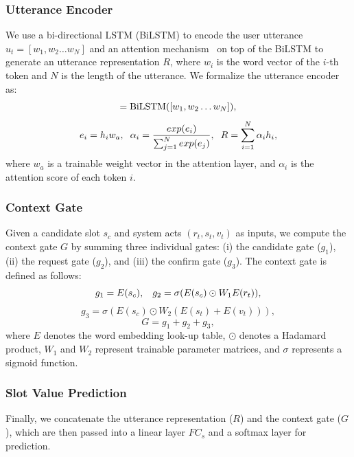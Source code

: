 \documentclass[letterpaper]{article}
\begin{document}
\subsubsection{Utterance Encoder}
We use a bi-directional LSTM (BiLSTM) to encode the user utterance $u_t=[w_1, w_2 \dots w_N]$ and an attention mechanism~\cite{felbo2017using} on top of the BiLSTM to generate an utterance representation $R$, where $w_i$ is the word vector of the $i$-th token and $N$ is the length of the utterance. We formalize the utterance encoder as:
\begin{equation}
    [h_1, h_2 \dots h_N] = \textnormal{BiLSTM}([w_1, w_2 \dots  w_N]),
\end{equation}
\begin{equation} \label{eq5}
    e_i = h_i w_a, \hspace{2mm}
    \alpha_i = \frac{exp(e_i)}{\sum_{j=1}^N exp(e_j)}, \hspace{2mm} R = \sum_{i=1}^N \alpha_i h_i,
\end{equation}
where $w_a$ is a trainable weight vector in the attention layer, and $\alpha_i$ is the attention score of each token $i$.

\subsubsection{Context Gate}
Given a candidate slot $s_c$ and system acts $(r_t, s_t, v_t)$ as inputs, we compute the context gate $G$ by summing three individual gates: (i) the candidate gate ($g_1$), (ii) the request gate ($g_2$), and (iii) the confirm gate ($g_3$). The context gate is defined as follows:
\begin{equation}
    g_1 = E(s_c), \hspace{3mm} g_2 = \sigma(E(s_c) \odot W_1 E(r_t)),
\end{equation}
\begin{equation}
    g_3 = \sigma(E(s_c) \odot W_2 (E(s_t)+E(v_t))),
\end{equation}
\begin{equation}
    G = g_1 + g_2 + g_3,
\end{equation}
where $E$ denotes the word embedding look-up table, $\odot$ denotes a Hadamard product, $W_1$ and $W_2$ represent trainable parameter matrices, and $\sigma$ represents a sigmoid function.

\subsubsection{Slot Value Prediction}
Finally, we concatenate the utterance representation ($R$) and the context gate ($G$), which are then passed into a linear layer $FC_s$ and a softmax layer for prediction.
\end{document}
